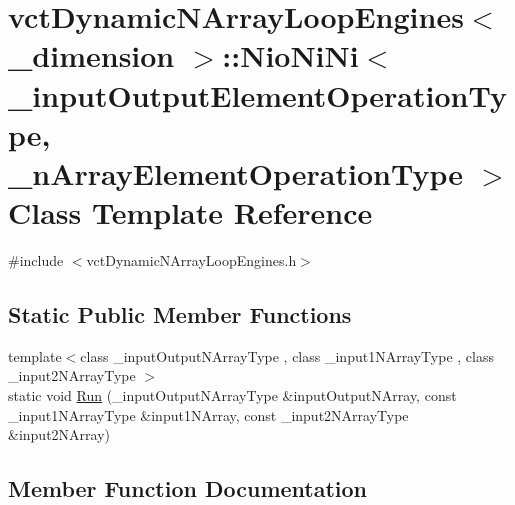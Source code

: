 \hypertarget{classvct_dynamic_n_array_loop_engines_1_1_nio_ni_ni}{}\section{vct\+Dynamic\+N\+Array\+Loop\+Engines$<$ \+\_\+dimension $>$\+:\+:Nio\+Ni\+Ni$<$ \+\_\+input\+Output\+Element\+Operation\+Type, \+\_\+n\+Array\+Element\+Operation\+Type $>$ Class Template Reference}
\label{classvct_dynamic_n_array_loop_engines_1_1_nio_ni_ni}


{\ttfamily \#include $<$vct\+Dynamic\+N\+Array\+Loop\+Engines.\+h$>$}

\subsection*{Static Public Member Functions}
\begin{DoxyCompactItemize}
\item 
{\footnotesize template$<$class \+\_\+input\+Output\+N\+Array\+Type , class \+\_\+input1\+N\+Array\+Type , class \+\_\+input2\+N\+Array\+Type $>$ }\\static void \hyperlink{classvct_dynamic_n_array_loop_engines_1_1_nio_ni_ni_a053c4648b8ea9c5fa4fe592246a9f765}{Run} (\+\_\+input\+Output\+N\+Array\+Type \&input\+Output\+N\+Array, const \+\_\+input1\+N\+Array\+Type \&input1\+N\+Array, const \+\_\+input2\+N\+Array\+Type \&input2\+N\+Array)
\end{DoxyCompactItemize}


\subsection{Member Function Documentation}
\hypertarget{classvct_dynamic_n_array_loop_engines_1_1_nio_ni_ni_a053c4648b8ea9c5fa4fe592246a9f765}{}
